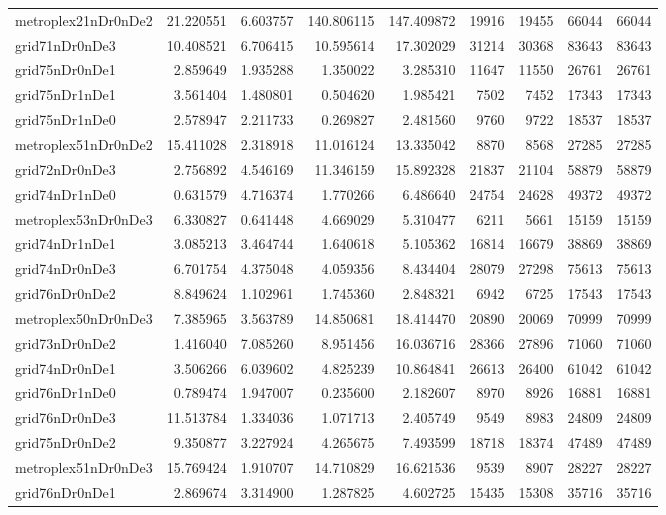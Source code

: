 \begin{longtable}{|l|r|r|r|r|r|r|r|r|}
metroplex21nDr0nDe2 & 21.220551 & 6.603757 & 140.806115 & 147.409872 & 19916 & 19455 & 66044 & 66044 \\
grid71nDr0nDe3 & 10.408521 & 6.706415 & 10.595614 & 17.302029 & 31214 & 30368 & 83643 & 83643 \\
grid75nDr0nDe1 & 2.859649 & 1.935288 & 1.350022 & 3.285310 & 11647 & 11550 & 26761 & 26761 \\
grid75nDr1nDe1 & 3.561404 & 1.480801 & 0.504620 & 1.985421 & 7502 & 7452 & 17343 & 17343 \\
grid75nDr1nDe0 & 2.578947 & 2.211733 & 0.269827 & 2.481560 & 9760 & 9722 & 18537 & 18537 \\
metroplex51nDr0nDe2 & 15.411028 & 2.318918 & 11.016124 & 13.335042 & 8870 & 8568 & 27285 & 27285 \\
grid72nDr0nDe3 & 2.756892 & 4.546169 & 11.346159 & 15.892328 & 21837 & 21104 & 58879 & 58879 \\
grid74nDr1nDe0 & 0.631579 & 4.716374 & 1.770266 & 6.486640 & 24754 & 24628 & 49372 & 49372 \\
metroplex53nDr0nDe3 & 6.330827 & 0.641448 & 4.669029 & 5.310477 & 6211 & 5661 & 15159 & 15159 \\
grid74nDr1nDe1 & 3.085213 & 3.464744 & 1.640618 & 5.105362 & 16814 & 16679 & 38869 & 38869 \\
grid74nDr0nDe3 & 6.701754 & 4.375048 & 4.059356 & 8.434404 & 28079 & 27298 & 75613 & 75613 \\
grid76nDr0nDe2 & 8.849624 & 1.102961 & 1.745360 & 2.848321 & 6942 & 6725 & 17543 & 17543 \\
metroplex50nDr0nDe3 & 7.385965 & 3.563789 & 14.850681 & 18.414470 & 20890 & 20069 & 70999 & 70999 \\
grid73nDr0nDe2 & 1.416040 & 7.085260 & 8.951456 & 16.036716 & 28366 & 27896 & 71060 & 71060 \\
grid74nDr0nDe1 & 3.506266 & 6.039602 & 4.825239 & 10.864841 & 26613 & 26400 & 61042 & 61042 \\
grid76nDr1nDe0 & 0.789474 & 1.947007 & 0.235600 & 2.182607 & 8970 & 8926 & 16881 & 16881 \\
grid76nDr0nDe3 & 11.513784 & 1.334036 & 1.071713 & 2.405749 & 9549 & 8983 & 24809 & 24809 \\
grid75nDr0nDe2 & 9.350877 & 3.227924 & 4.265675 & 7.493599 & 18718 & 18374 & 47489 & 47489 \\
metroplex51nDr0nDe3 & 15.769424 & 1.910707 & 14.710829 & 16.621536 & 9539 & 8907 & 28227 & 28227 \\
grid76nDr0nDe1 & 2.869674 & 3.314900 & 1.287825 & 4.602725 & 15435 & 15308 & 35716 & 35716 \\

\end{longtable}
